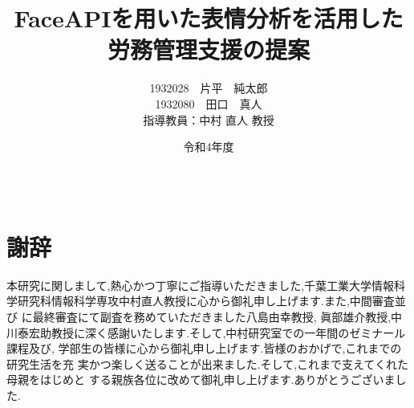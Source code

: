 \documentclass[12pt]{ltjsreport}%
\title{FaceAPIを用いた表情分析を活用した\\労務管理支援の提案}					%
\author{1932028　片平　純太郎\\1932080　田口　真人\\\normalsize 指導教員：中村 直人 教授}	%
\date{令和4年度}                                %
\begin{document}
\maketitle                          %
\tableofcontents                 %
\listoffigures				 %
\listoftables				 %

\baselineskip 20pt               %


\clearpage
{}


%










\newpage



\chapter*{　\\謝辞}
本研究に関しまして,熱心かつ丁寧にご指導いただきました,千葉工業大学情報科
学研究科情報科学専攻中村直人教授に心から御礼申し上げます.また,中間審査並び
に最終審査にて副査を務めていただきました八島由幸教授, 眞部雄介教授,中川泰宏助教授に深く感謝いたします.そして,中村研究室での一年間のゼミナール課程及び,
学部生の皆様に心から御礼申し上げます.皆様のおかげで,これまでの研究生活を充
実かつ楽しく送ることが出来ました.そして,これまで支えてくれた母親をはじめと
する親族各位に改めて御礼申し上げます.ありがとうございました.

\end{document}
